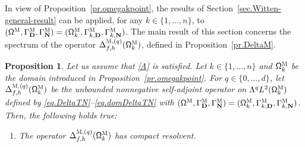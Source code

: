 \documentclass[JEP,XML,SOM,Unicode,NoEqCountersInSection,NoFloatCountersInSection,published]{cedram}
\newenvironment{enumeratei}
{\bgroup\def\theenumi{\roman{enumi}}\def\theenumii{\arabic{enumii}}\begin{enumerate}}
{\end{enumerate}\egroup}
\newcommand{\mbf}[1]{\mathbf{#1}}
\theoremstyle{plain}
\newtheorem{proposition}{Proposition}
\theoremstyle{definition}
\begin{document}
\label{sec.specM}

In view of Proposition~\ref{pr.omegakpoint}, the results of Section~\ref{sec.Witten-general-result} can be applied, for any
$k\in\{1,\ldots,n\}$, to $(\mathsf \Omega^{\textsc{M}}, \Gamma^{\textsc{M}}_{\mbf D}, \Gamma^{\textsc{M}}_{\mbf N}) = (\mathsf \Omega_k^{\textsc{M}}, \Gamma_{k,\mbf D}^{\textsc{M}}, \Gamma_{k,\mbf N}^{\textsc{M}})$.
The main result of this section concerns the spectrum of the operator
$\Delta_{f,h}^{\textsc{M}, (q)} (\mathsf \Omega_k^{\textsc{M}})$,
defined in Proposition~\ref{pr.DeltaM}.

\begin{proposition}
\label{pr.DeltaTN}
Let us assume that \ref{A} is satisfied. Let
$k\in\{1,\ldots,n\}$ and $ \mathsf \Omega_k^{\textsc{M}} $ be the
domain introduced in Proposition~\ref{pr.omegakpoint}. For $q\in\{0,\ldots,d\}$, let $\Delta_{f,h}^{\textsc{M}, (q)}(\mathsf \Omega_k^{\textsc{M}})$ be the unbounded
nonnegative self-adjoint operator on
$ \Lambda^qL^{2} (\mathsf \Omega_k^{\textsc{M}})$ defined by \eqref{eq.DeltaTN}--\eqref{eq.domDeltaTN} with $(\mathsf \Omega^{\textsc{M}}, \Gamma^{\textsc{M}}_{\mbf D}, \Gamma^{\textsc{M}}_{\mbf N}) = (\mathsf \Omega_k^{\textsc{M}}, \Gamma_{k,\mbf D}^{\textsc{M}}, \Gamma_{k,\mbf N}^{\textsc{M}})$.
Then, the following holds true:
\begin{enumeratei}
\item\label{pr.DeltaTNi}
The operator $\Delta_{f,h}^{\textsc{M},(q)} (\mathsf \Omega_k^{\textsc{M}})$ has compact resolvent.


\end{enumeratei}
\end{proposition}
\end{document}
